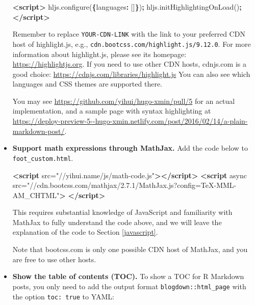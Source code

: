 \documentclass[12pt,]{krantz}
\makeatletter
\newenvironment{Shaded}{\begin{snugshade}}{\end{snugshade}}
\newcommand{\KeywordTok}[1]{\textcolor[rgb]{0.13,0.29,0.53}{\textbf{#1}}}
\newcommand{\DataTypeTok}[1]{\textcolor[rgb]{0.13,0.29,0.53}{#1}}
\newcommand{\StringTok}[1]{\textcolor[rgb]{0.31,0.60,0.02}{#1}}
\newcommand{\OtherTok}[1]{\textcolor[rgb]{0.56,0.35,0.01}{#1}}
\newcommand{\VariableTok}[1]{\textcolor[rgb]{0.00,0.00,0.00}{#1}}
\newcommand{\OperatorTok}[1]{\textcolor[rgb]{0.81,0.36,0.00}{\textbf{#1}}}
\newcommand{\AttributeTok}[1]{\textcolor[rgb]{0.77,0.63,0.00}{#1}}
\newcommand{\NormalTok}[1]{#1}
\newenvironment{kframe}{%
\medskip{}
\setlength{\fboxsep}{.8em}
 \def\at@end@of@kframe{}%
 \ifinner\ifhmode%
  \def\at@end@of@kframe{\end{minipage}}%
  \begin{minipage}{\columnwidth}%
 \fi\fi%
 \def\FrameCommand##1{\hskip\@totalleftmargin \hskip-\fboxsep
 \colorbox{shadecolor}{##1}\hskip-\fboxsep
     \hskip-\linewidth \hskip-\@totalleftmargin \hskip\columnwidth}%
 \MakeFramed {\advance\hsize-\width
   \@totalleftmargin\z@ \linewidth\hsize
   \@setminipage}}%
 {\par\unskip\endMakeFramed%
 \at@end@of@kframe}
\renewenvironment{Shaded}{\begin{kframe}}{\end{kframe}}
\theoremstyle{definition}
\theoremstyle{definition}
\theoremstyle{definition}
\theoremstyle{remark}
\makeatother
\begin{document}
\begin{itemize}
\begin{Shaded}
\begin{Highlighting}[]
\KeywordTok{<script>}
\VariableTok{hljs}\NormalTok{.}\AttributeTok{configure}\NormalTok{(}\OperatorTok{\{}\DataTypeTok{languages}\OperatorTok{:}\NormalTok{ []}\OperatorTok{\}}\NormalTok{)}\OperatorTok{;}
\VariableTok{hljs}\NormalTok{.}\AttributeTok{initHighlightingOnLoad}\NormalTok{()}\OperatorTok{;}
\KeywordTok{</script>}
\end{Highlighting}
\end{Shaded}

  Remember to replace \texttt{YOUR-CDN-LINK} with the link to your
  preferred CDN host of highlight.js, e.g.,
  \texttt{cdn.bootcss.com/highlight.js/9.12.0}. For more information
  about highlight.js, please see its homepage:
  \url{https://highlightjs.org}. If you need to use other CDN hosts,
  cdnjs.com is a good choice:
  \url{https://cdnjs.com/libraries/highlight.js} You can also see which
  languages and CSS themes are supported there.

  You may see \url{https://github.com/yihui/hugo-xmin/pull/5} for an
  actual implementation, and a sample page with syntax highlighting at
  \url{https://deploy-preview-5--hugo-xmin.netlify.com/post/2016/02/14/a-plain-markdown-post/}.
\item
  \textbf{Support math expressions through MathJax.} Add the code
  below to \texttt{foot\_custom.html}.

\begin{Shaded}
\begin{Highlighting}[]
\KeywordTok{<script}\OtherTok{ src=}\StringTok{"//yihui.name/js/math-code.js"}\KeywordTok{></script>}
\KeywordTok{<script}\OtherTok{ async}
\OtherTok{src=}\StringTok{"//cdn.bootcss.com/mathjax/2.7.1/MathJax.js?config=TeX-MML-AM_CHTML"}\KeywordTok{>}
\KeywordTok{</script>}
\end{Highlighting}
\end{Shaded}

  This requires substantial knowledge of JavaScript and familiarity with
  MathJax to fully understand the code above, and we will leave the
  explanation of the code to Section \ref{javascript}.

  Note that bootcss.com is only one possible CDN host of MathJax, and
  you are free to use other hosts.
\item
  \textbf{Show the table of contents (TOC).} To show a
  TOC for R Markdown posts, you only need to
  add the output format \texttt{blogdown::html\_page} with the option
  \texttt{toc:\ true} to YAML:


\end{itemize}
\end{document}
